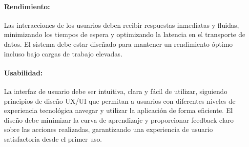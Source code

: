 \paragraph{Rendimiento:}
Las interacciones de los usuarios deben recibir respuestas inmediatas y fluidas, minimizando los tiempos de espera y optimizando la latencia en el transporte de datos. El sistema debe estar diseñado para mantener un rendimiento óptimo incluso bajo cargas de trabajo elevadas.

\paragraph{Usabilidad:}
La interfaz de usuario debe ser intuitiva, clara y fácil de utilizar, siguiendo principios de diseño UX/UI que permitan a usuarios con diferentes niveles de experiencia tecnológica navegar y utilizar la aplicación de forma eficiente. El diseño debe minimizar la curva de aprendizaje y proporcionar feedback claro sobre las acciones realizadas, garantizando una experiencia de usuario satisfactoria desde el primer uso.